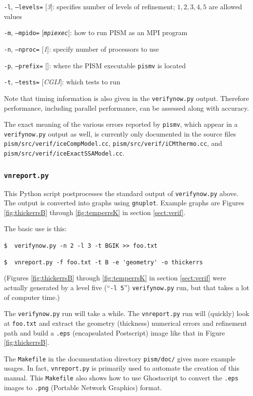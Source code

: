 \documentclass[11pt,final]{amsart}
\newcommand{\optoptdef}[3]{\vspace{1mm}\noindent \large\texttt{-#1},\,\,\texttt{--#2=}\normalsize\,\,[\textsl{#3}]:\quad}
\begin{document}
\optoptdef{l}{levels}{3} specifies number of levels of refinement; $1,2,3,4,5$ are allowed values

\optoptdef{m}{mpido}{\texttt{mpiexec}} how to run PISM as an MPI program

\optoptdef{n}{nproc}{1} specify number of processors to use

\optoptdef{p}{prefix}{} where the PISM executable \verb|pismv| is located

\optoptdef{t}{tests}{CGIJ} which tests to run

\medskip
Note that timing information is also given in the \verb|verifynow.py| output.  Therefore performance, including parallel performance, can be assessed along with accuracy.

The exact meaning of the various errors reported by \verb|pismv|, which appear in a \verb|verifynow.py| output as well, is currently only documented in the source files \verb|pism/src/verif/iceCompModel.cc|, \verb|pism/src/verif/iCMthermo.cc|, and \verb|pism/src/verif/iceExactSSAModel.cc|.  


\subsubsection*{\Large{\texttt{vnreport.py}}}  This Python script postprocesses the standard output of \verb|verifynow.py| above.  The output is converted into graphs using \verb|gnuplot|.  Example graphs are Figures \ref{fig:thickerrsB} through \ref{fig:temperrsK} in section \ref{sect:verif}.

The basic use is this:

\verb|$  verifynow.py -n 2 -l 3 -t BGIK >> foo.txt|

\verb|$  vnreport.py -f foo.txt -t B -e 'geometry' -o thickerrs|

\noindent (Figures \ref{fig:thickerrsB} through \ref{fig:temperrsK} in section \ref{sect:verif} were actually generated by a level five (``\verb|-l 5|'') \verb|verifynow.py| run, but that takes a lot of computer time.)

The \verb|verifynow.py| run will take a while.  The \verb|vnreport.py| run will (quickly) look at \verb|foo.txt| and extract the geometry (thickness) numerical errors and refinement path and build a \verb|.eps| (encapsulated Postscript) image like that in Figure \ref{fig:thickerrsB}.

The \verb|Makefile| in the documentation directory \verb|pism/doc/| gives more example usages.  In fact, \verb|vnreport.py| is primarily used to automate the creation of this manual.  This \verb|Makefile| also shows how to use Ghostscript to convert the \verb|.eps| images to \verb|.png| (Portable Network Graphics) format.
\end{document}

